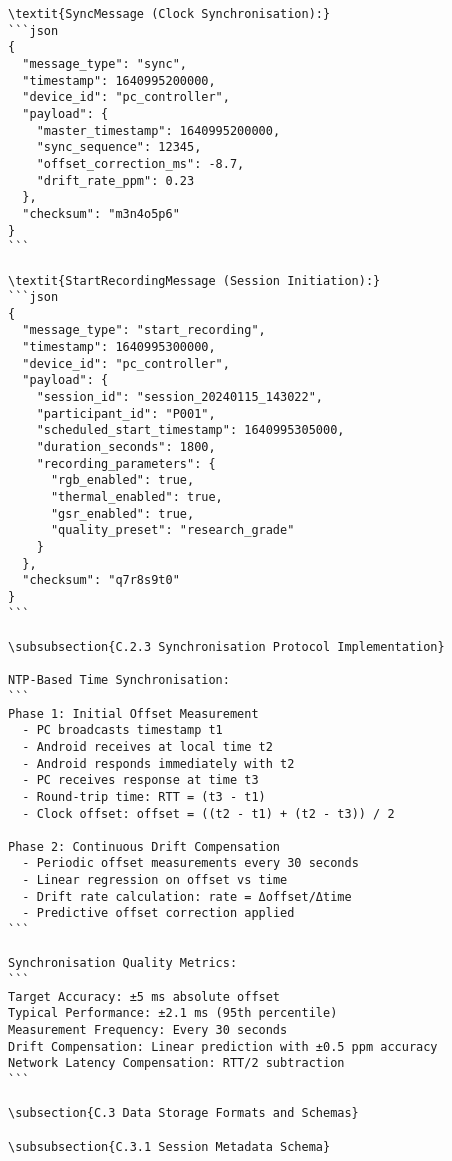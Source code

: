 \begin{verbatim}
\textit{SyncMessage (Clock Synchronisation):}
```json
{
  "message_type": "sync",
  "timestamp": 1640995200000,
  "device_id": "pc_controller",
  "payload": {
    "master_timestamp": 1640995200000,
    "sync_sequence": 12345,
    "offset_correction_ms": -8.7,
    "drift_rate_ppm": 0.23
  },
  "checksum": "m3n4o5p6"
}
```

\textit{StartRecordingMessage (Session Initiation):}
```json
{
  "message_type": "start_recording",
  "timestamp": 1640995300000,
  "device_id": "pc_controller",
  "payload": {
    "session_id": "session_20240115_143022",
    "participant_id": "P001",
    "scheduled_start_timestamp": 1640995305000,
    "duration_seconds": 1800,
    "recording_parameters": {
      "rgb_enabled": true,
      "thermal_enabled": true,
      "gsr_enabled": true,
      "quality_preset": "research_grade"
    }
  },
  "checksum": "q7r8s9t0"
}
```

\subsubsection{C.2.3 Synchronisation Protocol Implementation}

NTP-Based Time Synchronisation:
```
Phase 1: Initial Offset Measurement
  - PC broadcasts timestamp t1
  - Android receives at local time t2
  - Android responds immediately with t2
  - PC receives response at time t3
  - Round-trip time: RTT = (t3 - t1)
  - Clock offset: offset = ((t2 - t1) + (t2 - t3)) / 2

Phase 2: Continuous Drift Compensation
  - Periodic offset measurements every 30 seconds
  - Linear regression on offset vs time
  - Drift rate calculation: rate = Δoffset/Δtime
  - Predictive offset correction applied
```

Synchronisation Quality Metrics:
```
Target Accuracy: ±5 ms absolute offset
Typical Performance: ±2.1 ms (95th percentile)
Measurement Frequency: Every 30 seconds
Drift Compensation: Linear prediction with ±0.5 ppm accuracy
Network Latency Compensation: RTT/2 subtraction
```

\subsection{C.3 Data Storage Formats and Schemas}

\subsubsection{C.3.1 Session Metadata Schema}


\end{verbatim}
